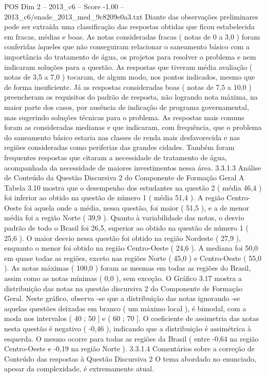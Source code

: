 \begin{textsample}{POS Dim 2 – 2013\_c6 – Score -1.00 – 2013\_c6/enade\_2013\_med\_9c8209e0a3.txt}
Diante das observações preliminares pode ser extraída uma classificação das respostas obtidas que ficou estabelecida em fracas, médias e boas.
As notas consideradas fracas ( notas de 0 a 3,0 ) foram conferidas àqueles que não conseguiram relacionar o saneamento básico com a importância do tratamento de água, os projetos para resolver o problema e nem indicaram soluções para a questão.
As respostas que tiveram média avaliação ( notas de 3,5 a 7,0 ) tocaram, de algum modo, nos pontos indicados, mesmo que de forma insuficiente.
Já as respostas consideradas boas ( notas de 7,5 a 10,0 ) preencheram os requisitos do padrão de resposta, não logrando nota máxima, na maior parte dos casos, por ausência de indicação de programa governamental, mas sugerindo soluções técnicas para o problema.
As respostas mais comuns foram as consideradas medianas e que indicaram, com frequência, que o problema do saneamento básico estaria nas classes de renda mais desfavorecida e nas regiões consideradas como periferias das grandes cidades.
Também foram frequentes respostas que citaram a necessidade de tratamento de água, acompanhada da necessidade de maiores investimentos nessa área. 3.3.1.3 Análise de Conteúdo da Questão Discursiva 2 do Componente de Formação Geral A Tabela 3.10 mostra que o desempenho dos estudantes na questão 2 ( média 46,4 ) foi inferior ao obtido na questão de número 1 ( média 51,4 ).
A região Centro-Oeste foi aquela onde a média, nessa questão, foi maior ( 51,5 ), e a de menor média foi a região Norte ( 39,9 ).
Quanto à variabilidade das notas, o desvio padrão de todo o Brasil foi 26,5, superior ao obtido na questão de número 1 ( 25,6 ).
O maior desvio nessa questão foi obtido na região Nordeste ( 27,9 ), enquanto o menor foi obtido na região Centro-Oeste ( 24,6 ).
A mediana foi 50,0 em quase todas as regiões, exceto nas regiões Norte ( 45,0 ) e Centro-Oeste ( 55,0 ).
As notas máximas ( 100,0 ) foram as mesmas em todas as regiões do Brasil, assim como as notas mínimas ( 0,0 ), sem exceção.
O Gráfico 3.17 mostra a distribuição das notas na questão discursiva 2 do Componente de Formação Geral.
Neste gráfico, observa -se que a distribuição das notas ignorando -se aquelas questões deixadas em branco ( um máximo local ), é bimodal, com a moda nos intervalos ( 40 ; 50 ] e ( 60 ; 70 ].
O coeficiente de assimetria das notas nesta questão é negativo ( -0,46 ), indicando que a distribuição é assimétrica à esquerda.
O mesmo ocorre para todas as regiões da Brasil ( entre -0,64 na região Centro-Oeste e -0,19 na região Norte ). 3.3.1.4 Comentários sobre a correção de Conteúdo das respostas à Questão Discursiva 2 O tema abordado no enunciado, apesar da complexidade, é extremamente atual.

\end{textsample}
